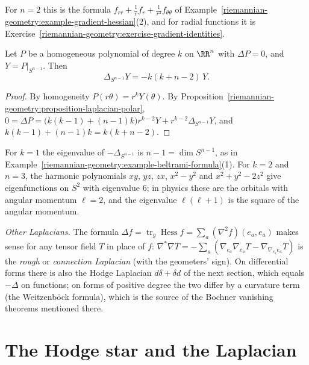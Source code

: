 For $n = 2$ this is the formula $f_{rr} + \frac1rf_r + \frac1{r^2}f_{\theta\theta}$ of Example~\ref{riemannian-geometry:example-gradient-hessian}(2), and for radial functions it is
Exercise~\ref{riemannian-geometry:exercise-gradient-identities}.

\begin{corollary}\label{riemannian-geometry:corollary-spherical-harmonics}
Let $P$ be a homogeneous polynomial of degree $k$ on $\RR^n$ with $\Delta P = 0$, and $Y = P|_{S^{n-1}}$. Then
\[
\Delta_{S^{n-1}}Y = -k(k + n - 2)\,Y .
\]
\end{corollary}

\begin{proof}
By homogeneity $P(r\theta) = r^kY(\theta)$. By Proposition~\ref{riemannian-geometry:proposition-laplacian-polar},
$0 = \Delta P = \bigl(k(k - 1) + (n - 1)k\bigr)r^{k-2}Y + r^{k-2}\Delta_{S^{n-1}}Y$, and $k(k - 1) + (n - 1)k = k(k + n - 2)$.
\end{proof}

For $k = 1$ the eigenvalue of $-\Delta_{S^{n-1}}$ is $n - 1 = \dim S^{n-1}$, as in Example~\ref{riemannian-geometry:example-beltrami-formula}(1). For $k = 2$ and $n = 3$, the harmonic
polynomials $xy$, $yz$, $zx$, $x^2 - y^2$ and $x^2 + y^2 - 2z^2$ give eigenfunctions on $S^2$ with eigenvalue $6$; in physics these are the orbitals with angular momentum $\ell = 2$, and
the eigenvalue $\ell(\ell + 1)$ is the square of the angular momentum.

\begin{remark}\label{riemannian-geometry:remark-laplacians}
\emph{Other Laplacians.} The formula $\Delta f = \operatorname{tr}_g\operatorname{Hess}f = \sum_a(\nabla^2f)(e_a, e_a)$ makes sense for any tensor field $T$ in place of $f$:
$\nabla^*\nabla T = -\sum_a(\nabla_{e_a}\nabla_{e_a}T - \nabla_{\nabla_{e_a}e_a}T)$ is the \emph{rough} or \emph{connection Laplacian} (with the geometers' sign). On differential forms there is
also the Hodge Laplacian $d\delta + \delta d$ of the next section, which equals $-\Delta$ on functions; on forms of positive degree the two differ by a curvature term (the
Weitzenb\"ock formula), which is the source of the Bochner vanishing theorems mentioned there.
\end{remark}

\section{The Hodge star and the Laplacian}\label{riemannian-geometry:section-hodge-star}

